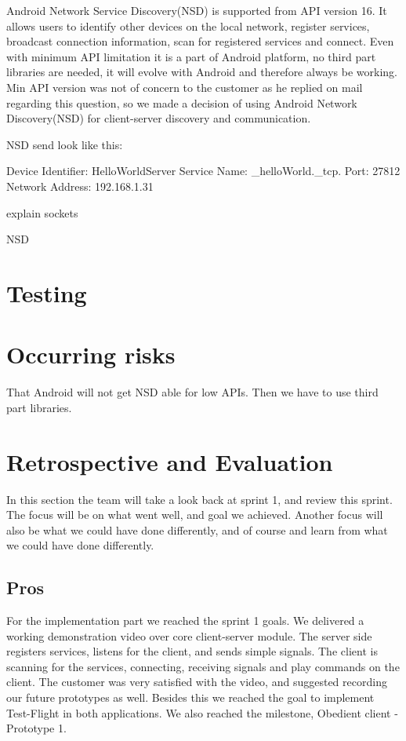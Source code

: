 Android Network Service Discovery(NSD) is supported from API version 16. 
It allows users to identify other devices on the local network, register services, broadcast connection information, scan for registered services and connect.
Even with minimum API limitation it is a part of Android platform, no third part libraries are needed, it will evolve with Android and therefore always be working.
Min API version was not of concern to the customer as he replied on mail regarding this question, so we made a decision of using Android Network Discovery(NSD) for client-server discovery and communication.

NSD send look like this:

Device Identifier: HelloWorldServer
Service Name: \_helloWorld.\_tcp.
Port: 27812
Network Address: 192.168.1.31

explain sockets

NSD
\section{Testing}

\section{Occurring risks}

That Android will not get NSD able for low APIs. 
Then we have to use third part libraries.

\section{Retrospective and Evaluation}
In this section the team will take a look back at sprint 1, and review this sprint. The focus will be on what went well, and goal we achieved. Another focus will also be what we could have done differently, and of course and learn from what we could have done differently.

\subsection{Pros}
For the implementation part we reached the sprint 1 goals. We delivered a working demonstration video over core client-server module. The server side registers services, listens for the client, and sends simple  signals. The client is scanning for the services, connecting, receiving signals and play commands on the client. The customer was very satisfied with the video, and suggested recording our future prototypes as well. Besides this we reached the goal to implement Test-Flight in both applications. We also reached the milestone, Obedient client - Prototype 1.

